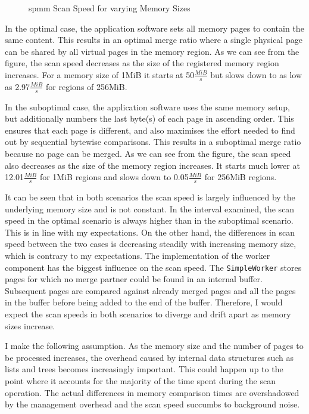 \begin{figure}
  \centering
  
  \caption{\acs{spmm} Scan Speed for varying Memory Sizes}
  \label{fig:scan-speed}
\end{figure}

In the optimal case, the application software sets all memory pages to contain the same content.
This results in an optimal merge ratio where a single physical page can be shared by all virtual pages in the memory region.
As we can see from the figure, the scan speed decreases as the size of the registered memory region increases.
For a memory size of 1MiB it starts at 50$\frac{MiB}{s}$ but slows down to as low as 2.97$\frac{MiB}{s}$ for regions of 256MiB.

In the suboptimal case, the application software uses the same memory setup, but additionally numbers the last byte(s) of each page in ascending order.
This ensures that each page is different, and also maximises the effort needed to find out by sequential bytewise comparisons.
This results in a suboptimal merge ratio because no page can be merged.
As we can see from the figure, the scan speed also decreases as the size of the memory region increases.
It starts much lower at 12.01$\frac{MiB}{s}$ for 1MiB regions and slows down to 0.05$\frac{MiB}{s}$ for 256MiB regions.

It can be seen that in both scenarios the scan speed is largely influenced by the underlying memory size and is not constant.
In the interval examined, the scan speed in the optimal scenario is always higher than in the suboptimal scenario.
This is in line with my expectations.
On the other hand, the differences in scan speed between the two cases is decreasing steadily with increasing memory size, which is contrary to my expectations.
The implementation of the worker component has the biggest influence on the scan speed.
The \texttt{Simple\-Worker} stores pages for which no merge partner could be found in an internal buffer.
Subsequent pages are compared against already merged pages and all the pages in the buffer before being added to the end of the buffer.
Therefore, I would expect the scan speeds in both scenarios to diverge and drift apart as memory sizes increase.

I make the following assumption.
As the memory size and the number of pages to be processed increases, the overhead caused by internal data structures such as lists and trees becomes increasingly important.
This could happen up to the point where it accounts for the majority of the time spent during the scan operation.
The actual differences in memory comparison times are overshadowed by the management overhead and the scan speed succumbs to background noise.

